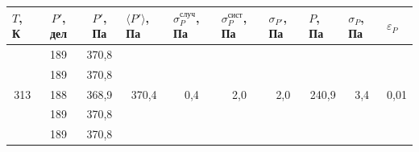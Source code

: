 \documentclass[a4paper,12pt]{article}
\begin{document}
\begin{table}[H]
\begin{tabular}{|c|c|c|c|c|c|c|c|c|c|}
\hline
\multicolumn{1}{|l|}{$ T $, К} & $ P' $, дел & $ P' $, Па & \multicolumn{1}{l|}{$ \langle P' \rangle $, Па} & \multicolumn{1}{l|}{$\sigma_P^{случ}$, Па} & \multicolumn{1}{l|}{$\sigma_P^{сист}$, Па} & \multicolumn{1}{l|}{$ \sigma_{P'} $, Па} & \multicolumn{1}{l|}{$ P $, Па} & \multicolumn{1}{l|}{$ \sigma_P $, Па} & \multicolumn{1}{l|}{$\varepsilon_P$} \\ \hline
\multirow{5}{*}{313}           & 189         & 370,8      & \multirow{5}{*}{370,4}                          & \multirow{5}{*}{0,4}                       & \multirow{5}{*}{2,0}                       & \multirow{5}{*}{2,0}                     & \multirow{5}{*}{240,9}         & \multirow{5}{*}{3,4}                  & \multirow{5}{*}{0,01}                \\ \cline{2-3}
                               & 189         & 370,8      &                                                 &                                            &                                            &                                          &                                &                                       &                                      \\ \cline{2-3}
                               & 188         & 368,9      &                                                 &                                            &                                            &                                          &                                &                                       &                                      \\ \cline{2-3}
                               & 189         & 370,8      &                                                 &                                            &                                            &                                          &                                &                                       &                                      \\ \cline{2-3}
                               & 189         & 370,8      &                                                 &                                            &                                            &                                          &                                &                                       &                                      \\ \hline
\end{tabular}
\end{table}
\end{document}
